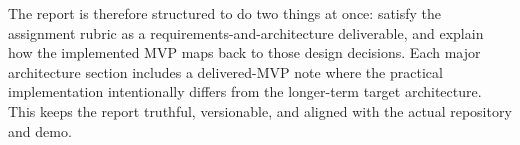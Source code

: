 The report is therefore structured to do two things at once: satisfy the assignment rubric as a
requirements-and-architecture deliverable, and explain how the implemented MVP maps back to those
design decisions. Each major architecture section includes a delivered-MVP note where the practical
implementation intentionally differs from the longer-term target architecture. This keeps the report
truthful, versionable, and aligned with the actual repository and demo.
